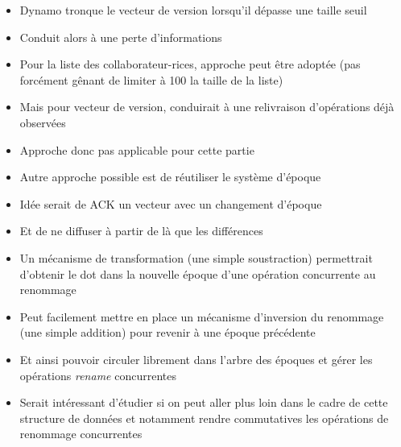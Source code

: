 \begin{itemize}
    \item Dynamo\cite{2007-dynamo} tronque le vecteur de version lorsqu'il dépasse une taille seuil
    \item Conduit alors à une perte d'informations
    \item Pour la liste des collaborateur-rices, approche peut être adoptée (pas forcément gênant de limiter à 100 la taille de la liste)
    \item Mais pour vecteur de version, conduirait à une relivraison d'opérations déjà observées
    \item Approche donc pas applicable pour cette partie
    \item Autre approche possible est de réutiliser le système d'époque
    \item Idée serait de ACK un vecteur avec un changement d'époque
    \item Et de ne diffuser à partir de là que les différences
    \item Un mécanisme de transformation (une simple soustraction) permettrait d'obtenir le dot dans la nouvelle époque d'une opération concurrente au renommage
    \item Peut facilement mettre en place un mécanisme d'inversion du renommage (une simple addition) pour revenir à une époque précédente
    \item Et ainsi pouvoir circuler librement dans l'arbre des époques et gérer les opérations \emph{rename} concurrentes
    \item Serait intéressant d'étudier si on peut aller plus loin dans le cadre de cette structure de données et notamment rendre commutatives les opérations de renommage concurrentes
  \end{itemize}
